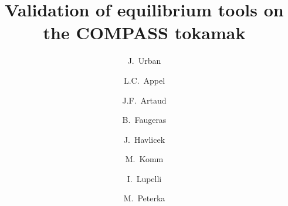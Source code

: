 \documentclass[preprint,5p,times]{elsarticle}
\begin{document}
\begin{frontmatter}



\title{Validation of equilibrium tools on the COMPASS tokamak}

 \author[label1]{J.~Urban}
 \author[label2]{L.C.~Appel}
 \author[label3]{J.F.~Artaud} 
 \author[label4]{B.~Faugeras} 
 \author[label1,label5]{J.~Havlicek}
 \author[label1]{M.~Komm}
 \author[label2]{I.~Lupelli} 
 \author[label1,label5]{M.~Peterka} 
 \address[label1]{Institute of Plasma Physics AS CR, v.v.i., Za~Slovankou 3, 182 00 Praha 8, Czech Republic}
 \address[label2]{CCFE, Culham Science Centre, Abingdon, Oxfordshire, UK}
 \address[label3]{CEA, IRFM, F-13108 Saint Paul Lez Durance, France}
 \address[label4]{Laboratoire J.A. Dieudonné, UMR 7351, Université de Nice Sophia-Antipolis, Parc Valrose, 06108
Nice Cedex 02, France}
 \address[label5]{Department of Surface and Plasma Science, Faculty of Mathematics and Physics, Charles University in Prague, V Hole\v{s}ovi\v{c}k\'ach 2, 180~00 Praha 8, Czech Republic}


\end{frontmatter}
\end{document}
